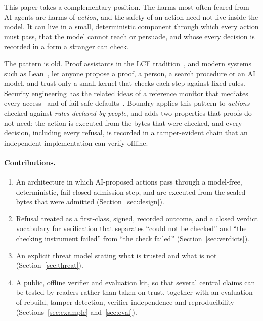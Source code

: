 \documentclass[11pt,a4paper]{article}
\begin{document}
This paper takes a complementary position. The harms most often feared from AI agents are harms of \emph{action}, and the safety of an action need not live inside the model. It can live in a small, deterministic component through which every action must pass, that the model cannot reach or persuade, and whose every decision is recorded in a form a stranger can check.

The pattern is old. Proof assistants in the LCF tradition~\citep{gordon1979lcf}, and modern systems such as Lean~\citep{demoura2021lean4}, let anyone propose a proof, a person, a search procedure or an AI model, and trust only a small kernel that checks each step against fixed rules. Security engineering has the related ideas of a reference monitor that mediates every access~\citep{anderson1972planning} and of fail-safe defaults~\citep{saltzer1975protection}. Boundry applies this pattern to \emph{actions} checked against \emph{rules declared by people}, and adds two properties that proofs do not need: the action is executed from the bytes that were checked, and every decision, including every refusal, is recorded in a tamper-evident chain that an independent implementation can verify offline.

\paragraph{Contributions.}
\begin{enumerate}
  \item An architecture in which AI-proposed actions pass through a model-free, deterministic, fail-closed admission step, and are executed from the sealed bytes that were admitted (Section~\ref{sec:design}).
  \item Refusal treated as a first-class, signed, recorded outcome, and a closed verdict vocabulary for verification that separates ``could not be checked'' and ``the checking instrument failed'' from ``the check failed'' (Section~\ref{sec:verdicts}).
  \item An explicit threat model stating what is trusted and what is not (Section~\ref{sec:threat}).
  \item A public, offline verifier and evaluation kit, so that several central claims can be tested by readers rather than taken on trust, together with an evaluation of rebuild, tamper detection, verifier independence and reproducibility (Sections~\ref{sec:example} and~\ref{sec:eval}).
\end{enumerate}
\end{document}
